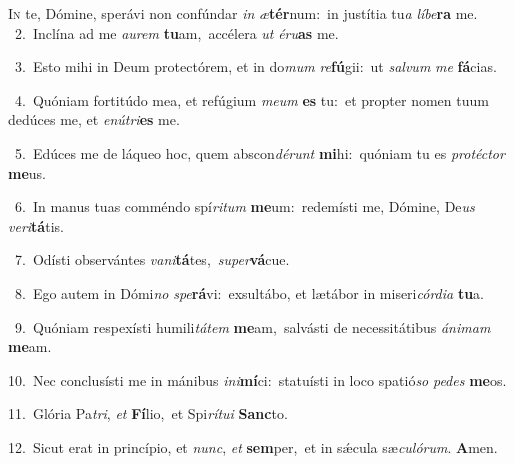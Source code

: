 \lettrine{\initial\textcolor{\initialcolor}{I}}{n} te, Dómine, sperávi non confúndar \textit{in} \textit{æ}\-\textbf{tér}num:~\star in justítia tu\textit{a} \textit{lí}\-\textit{be}\textbf{ra} me.\\
{\numbfont\textcolor{\numbcolor}{~2.}}~Inclína ad me \textit{au}\-\textit{rem} \textbf{tu}\-am,~\star accélera \textit{ut} \textit{é}\-\textit{ru}\textbf{as} me.\par
{\numbfont\textcolor{\numbcolor}{~3.}}~Esto mihi in Deum protectórem, et in do\textit{mum} \textit{re}\-\textbf{fú}gii:~\star ut \textit{sal}\-\textit{vum} \textit{me} \textbf{fá}\-cias.\par
{\numbfont\textcolor{\numbcolor}{~4.}}~Quóniam fortitúdo mea, et refúgium \textit{me}\-\textit{um} \textbf{es} tu:~\star et propter nomen tuum dedúces me, et \textit{e}\-\textit{nú}\textit{tri}\textbf{es} me.\par
{\numbfont\textcolor{\numbcolor}{~5.}}~Edúces me de láqueo hoc, quem abscon\-\textit{dé}\-\textit{runt} \textbf{mi}\-hi:~\star quóniam tu es \textit{pro}\-\textit{téc}\textit{tor} \textbf{me}\-us.\par
{\numbfont\textcolor{\numbcolor}{~6.}}~In manus tuas comméndo spí\-\textit{ri}\-\textit{tum} \textbf{me}\-um:~\star redemísti me, Dómine, De\textit{us} \textit{ve}\-\textit{ri}\textbf{tá}tis.\par
{\numbfont\textcolor{\numbcolor}{~7.}}~Odísti observántes \textit{va}\-\textit{ni}\textbf{tá}tes,~\star \textit{su}\-\textit{per}\textbf{vá}cue.\par
{\numbfont\textcolor{\numbcolor}{~8.}}~Ego autem in Dómi\textit{no} \textit{spe}\-\textbf{rá}vi:~\star exsultábo, et lætábor in miseri\-\textit{cór}\-\textit{di}\textit{a} \textbf{tu}\-a.\par
{\numbfont\textcolor{\numbcolor}{~9.}}~Quóniam respexísti humili\-\textit{tá}\-\textit{tem} \textbf{me}\-am,~\star salvásti de necessitátibus \textit{á}\-\textit{ni}\textit{mam} \textbf{me}\-am.\par
{\numbfont\textcolor{\numbcolor}{10.}}~Nec conclusísti me in mánibus \textit{in}\-\textit{i}\textbf{mí}ci:~\star statuísti in loco spatió\textit{so} \textit{pe}\-\textit{des} \textbf{me}\-os.\par
{\numbfont\textcolor{\numbcolor}{11.}}~Glória Pa\-\textit{tri}\-, \textit{et} \textbf{Fí}\-lio,~\star et Spi\-\textit{rí}\-\textit{tu}\textit{i} \textbf{Sanc}\-to.\par
{\numbfont\textcolor{\numbcolor}{12.}}~Sicut erat in princípio, et \textit{nunc}\-, \textit{et} \textbf{sem}\-per,~\star et in sǽcula sæ\-\textit{cu}\-\textit{ló}\textit{rum}. \textbf{A}\-men.\par

